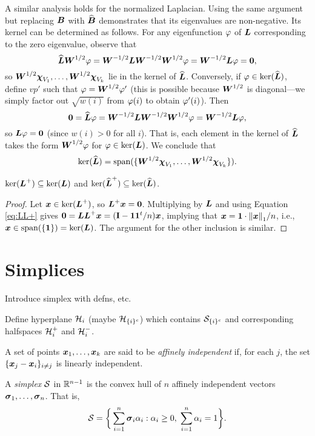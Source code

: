 A similar analysis holds for the normalized Laplacian. Using the same argument but replacing $\vb*{B}$ with $\widehat{\vb*{B}}$ demonstrates that its eigenvalues are non-negative. Its kernel can be determined as follows. For any eigenfunction $\varphi$ of $\vb*{L}$ corresponding to the zero eigenvalue, observe that 
\[\widehat{\vb*{L}}\vb*{W}^{1/2}\varphi = \vb*{W}^{-1/2}\vb*{L}\vb*{W}^{-1/2}\vb*{W}^{1/2}\varphi = \vb*{W}^{-1/2}\vb*{L}\varphi = \vb{0},\]
so $\vb*{W}^{1/2}\boldsymbol{\chi}_{V_1},\dots,\vb*{W}^{1/2}\boldsymbol{\chi}_{V_k}$ lie in the kernel of $\widehat{\vb*{L}}$.
Conversely, if $\varphi\in\ker(\widehat{\vb*{L}})$, define $vp'$ such that $\varphi=\vb*{W}^{1/2}\varphi'$ (this is possible because $\vb*{W}^{1/2}$ is diagonal---we simply factor out $\sqrt{w(i)}$ from $\varphi(i)$ to obtain $\varphi'(i)$). Then 
\[\vb{0} =\widehat{\vb*{L}}\varphi = \vb*{W}^{-1/2}\vb*{L} \vb*{W}^{-1/2}\vb*{W}^{1/2}\varphi = \vb*{W}^{-1/2}\vb*{L}\varphi,\]
so $\vb*{L}\varphi=\vb{0}$ (since $w(i)>0$ for all $i$). That is, each element in the kernel of $\widehat{\vb*{L}}$ takes the form $\vb*{W}^{1/2}\varphi$ for $\varphi\in\ker(\vb*{L})$. We conclude that 
\[\ker(\widehat{\vb*{L}})=\textnormal{span}(\{\vb*{W}^{1/2}\boldsymbol{\chi}_{V_1},\dots,\vb*{W}^{1/2}\boldsymbol{\chi}_{V_k}\}).\]




\begin{lemma}
$\ker(\vb*{L}^+)\subseteq\ker(\vb*{L})$ and $\ker(\widehat{\vb*{L}}^+)\subseteq\ker(\widehat{\vb*{L}})$.  
\end{lemma}
\begin{proof}
Let $\vb*{x}\in\ker(\vb*{L}^+)$, so $\vb*{L}^+\vb*{x}=\vb{0}$. Multiplying by $\vb*{L}$ and using Equation \eqref{eq:LL+} gives $\vb{0}=\vb*{L}\vb*{L}^+\vb*{x}=(\vb{I}-\vb{1}\vb{1}^t/n)\vb*{x}$, implying that $\vb*{x}=\vb{1} \cdot \norm{\vb*{x}}_1/n$, i.e., $\vb*{x}\in\textnormal{span}(\{\vb{1}\})=\ker(\vb*{L})$. The argument for the other inclusion is similar.
\end{proof}

\section{Simplices}
\TODO Introduce simplex with defns, etc. 

Define hyperplane $\mathcal{H}_i$ (maybe $\mathcal{H}_{\{i\}^c}$) which contains $\mathcal{S}_{\{i\}^c}$ and corresponding halfspaces $\mathcal{H}_i^+$ and $\mathcal{H}_i^-$. 

\begin{definition}
A set of points $\vb*{x}_1,\dots,\vb*{x}_k$ are said to be \emph{affinely independent} if, for each $j$,  the set $\{\vb*{x}_j-\vb*{x}_i\}_{i\neq j}$ is linearly independent. 
\end{definition}

\begin{definition}
A \emph{simplex} $\mathcal{S}$ in $\mathbb{R}^{n-1}$ is the convex hull of $n$ affinely independent vectors $\vb*{\sigma}_1,\dots,\vb*{\sigma}_n$. That is, 
\begin{equation*}
    \mathcal{S} = \bigg\{\sum_{i=1}^n \vb*{\sigma}_i \alpha_i: \alpha_i\geq 0,\; \sum_{i=1}^n \alpha_i=1\bigg\}. 
\end{equation*}
\end{definition}

